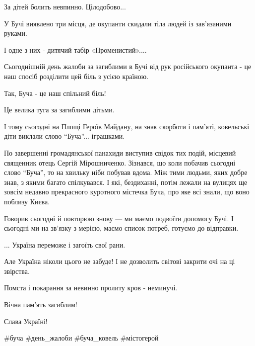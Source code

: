 За дітей болить невпинно. Цілодобово... 

У Бучі виявлено три місця, де окупанти скидали тіла людей із зав'язаними
руками. 

І одне з них - дитячий табір «Променистий».... 

Сьогоднішній день жалоби за загиблими в Бучі від рук російського окупанта - це
наш спосіб розділити цей біль з усією країною. 


Так, Буча - це наш спільний біль! 

Це велика туга за загиблими дітьми. 

І тому сьогодні на Площі Героїв Майдану, на знак скорботи і пам'яті, ковельські
діти виклали слово \enquote{Буча}... іграшками.

По завершенні громадянської панахиди виступив свідок тих подій, місцевий
священник отець Сергій Мірошниченко. Зізнався, що коли побачив сьогодні слово
\enquote{Буча}, то на хвильку ніби побував вдома. Між тими людьми, яких добре
знав, з якими багато спілкувався. І які, бездиханні, потім лежали на вулицях ще
зовсім недавно прекрасного куротного містечка Буча, про яке всі знали, що воно
поблизу Києва. 


Говорив сьогодні й повторюю знову — ми маємо подвоїти допомогу Бучі. І сьогодні
ми на зв'язку з мерією, маємо список потреб, готуємо до відправки. 


... Україна переможе і загоїть свої рани.

Але Україна ніколи цього не забуде! І не дозволить світові закрити очі на ці звірства. 

Помста і покарання за невинно пролиту кров - неминучі. 

Вічна пам'ять загиблим! 

Слава Україні! 

\#буча \#день\_жалоби \#буча\_ковель \#містогерой
